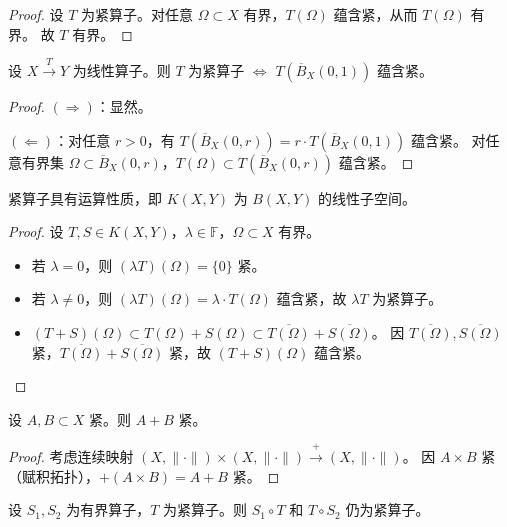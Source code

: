 \documentclass[lang=cn,a4paper,newtx,section]{elegantbook}
\begin{document}
\begin{proof}
  设 $T$ 为紧算子。对任意 $\Omega\subset X$ 有界，$T(\Omega)$ 蕴含紧，从而 $T(\Omega)$ 有界。
  故 $T$ 有界。
\end{proof}

\begin{proposition}
  设 $X\xrightarrow{T}Y$ 为线性算子。则 $T$ 为紧算子 $\Longleftrightarrow$ $T(\overline{B}_X(0,1))$ 蕴含紧。
\end{proposition}

\begin{proof}
  $(\Rightarrow)$：显然。

  $(\Leftarrow)$：对任意 $r>0$，有 $T(\overline{B}_X(0,r))=r\cdot T(\overline{B}_X(0,1))$ 蕴含紧。
  对任意有界集 $\Omega\subset\overline{B}_X(0,r)$，$T(\Omega)\subset T(\overline{B}_X(0,r))$ 蕴含紧。
\end{proof}

\begin{theorem}
  紧算子具有运算性质，即 $K(X,Y)$ 为 $B(X,Y)$ 的线性子空间。
\end{theorem}

\begin{proof}
  设 $T,S\in K(X,Y)$，$\lambda\in\mathbb{F}$，$\Omega\subset X$ 有界。
  \begin{itemize}
    \item 若 $\lambda=0$，则 $(\lambda T)(\Omega)=\{0\}$ 紧。
    \item 若 $\lambda\ne 0$，则 $(\lambda T)(\Omega)=\lambda\cdot T(\Omega)$ 蕴含紧，故 $\lambda T$ 为紧算子。
    \item $(T+S)(\Omega)\subset T(\Omega)+S(\Omega)\subset\overline{T(\Omega)}+\overline{S(\Omega)}$。
          因 $\overline{T(\Omega)},\overline{S(\Omega)}$ 紧，$\overline{T(\Omega)}+\overline{S(\Omega)}$ 紧，故 $(T+S)(\Omega)$ 蕴含紧。
  \end{itemize}
\end{proof}

\begin{proposition}
  设 $A,B\subset X$ 紧。则 $A+B$ 紧。
\end{proposition}

\begin{proof}
  考虑连续映射 $(X,\|\cdot\|)\times(X,\|\cdot\|)\xrightarrow{+}(X,\|\cdot\|)$。
  因 $A\times B$ 紧（赋积拓扑），$+(A\times B)=A+B$ 紧。
\end{proof}

\begin{theorem}
  设 $S_1,S_2$ 为有界算子，$T$ 为紧算子。则 $S_1\circ T$ 和 $T\circ S_2$ 仍为紧算子。
\end{theorem}
\end{document}
